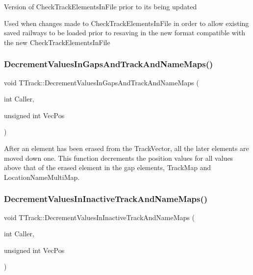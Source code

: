 Version of Check\+Track\+Elements\+In\+File prior to its being updated

Used when changes made to Check\+Track\+Elements\+In\+File in order to allow existing saved railways to be loaded prior to resaving in the new format compatible with the new Check\+Track\+Elements\+In\+File \mbox{\label{class_t_track_a2095a52c4b914bf6b29529a2d82043e9}} 
\subsubsection{\texorpdfstring{Decrement\+Values\+In\+Gaps\+And\+Track\+And\+Name\+Maps()}{DecrementValuesInGapsAndTrackAndNameMaps()}}
{\footnotesize\ttfamily void T\+Track\+::\+Decrement\+Values\+In\+Gaps\+And\+Track\+And\+Name\+Maps (\begin{DoxyParamCaption}\item[{int}]{Caller,  }\item[{unsigned int}]{Vec\+Pos }\end{DoxyParamCaption})}

After an element has been erased from the Track\+Vector, all the later elements are moved down one. This function decrements the position values for all values above that of the erased element in the gap elements, Track\+Map and Location\+Name\+Multi\+Map. \mbox{\label{class_t_track_af8f925ac5e7301c1094cec76808e1140}} 
\subsubsection{\texorpdfstring{Decrement\+Values\+In\+Inactive\+Track\+And\+Name\+Maps()}{DecrementValuesInInactiveTrackAndNameMaps()}}
{\footnotesize\ttfamily void T\+Track\+::\+Decrement\+Values\+In\+Inactive\+Track\+And\+Name\+Maps (\begin{DoxyParamCaption}\item[{int}]{Caller,  }\item[{unsigned int}]{Vec\+Pos }\end{DoxyParamCaption})}

